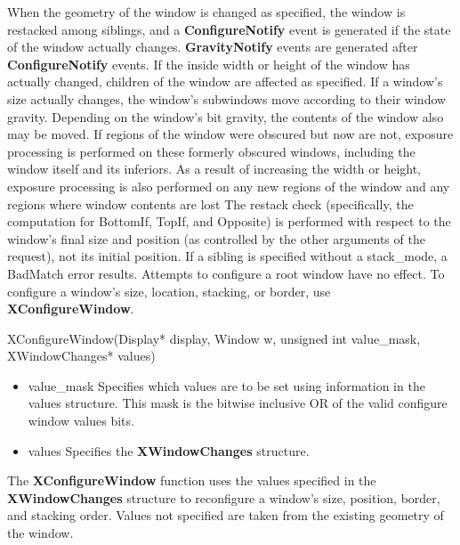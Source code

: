 \documentclass{report}
\begin{document}
\begin{itemize}
            \bigbreak \noindent 
            When the geometry of the window is changed as specified, the window is restacked among siblings, and a \textbf{ConfigureNotify} event is generated if the state of the window actually changes. \textbf{GravityNotify} events are generated after \textbf{ConfigureNotify} events. If the inside width or height of the window has actually changed, children of the window are affected as specified.
            \bigbreak \noindent 
            If a window’s size actually changes, the window’s subwindows move according to their window gravity. Depending on the window’s bit gravity, the contents of the window also may be moved.
            \bigbreak \noindent 
            If regions of the window were obscured but now are not, exposure processing is performed on these formerly obscured windows, including the window itself and its inferiors. As a result of increasing the width or height, exposure processing is also performed on any new regions of the window and any regions where window contents are lost
            \bigbreak \noindent 
            The restack check (specifically, the computation for BottomIf, TopIf, and Opposite) is performed with respect to the window’s final size and position (as controlled by the other arguments of the request), not its initial position. If a sibling is specified without a stack\_mode, a BadMatch error results.
            \bigbreak \noindent 
            Attempts to configure a root window have no effect.
            \bigbreak \noindent 
            To configure a window’s size, location, stacking, or border, use \textbf{XConfigureWindow}.
            \bigbreak \noindent 
            \begin{cppcode}
                XConfigureWindow(Display* display, Window w, unsigned int value_mask, XWindowChanges* values)
            \end{cppcode}
            \bigbreak \noindent
            \begin{itemize}
                \item value\_mask Specifies which values are to be set using information in the values structure. This mask is the bitwise inclusive OR of the valid configure window values bits.
                \item values Specifies the \textbf{XWindowChanges} structure.
            \end{itemize}
            The \textbf{XConfigureWindow} function uses the values specified in the \textbf{XWindowChanges} structure to reconfigure a window’s size, position, border, and stacking order. Values not specified are taken from the existing geometry of the window.

\end{itemize}
\end{document}
